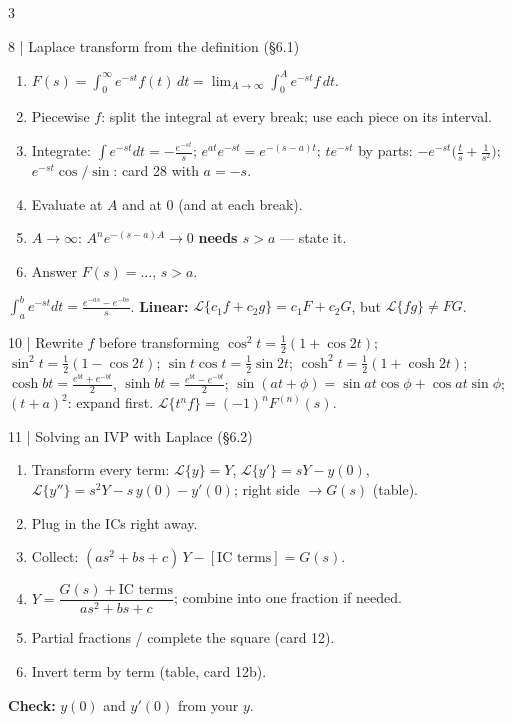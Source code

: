\documentclass[8pt]{extarticle}
\newcommand{\key}[1]{\textcolor{grn}{\textbf{#1}}}
\newcommand{\chk}[1]{\par\textcolor{grn}{\textbf{Check:}} #1}
\newcommand{\Lap}{\mathcal{L}}
\begin{document}
\begin{multicols*}{3}
\begin{card}{8 \;|\; Laplace transform from the definition (\S6.1)}
\begin{enumerate}
\item $F(s)=\displaystyle\int_0^\infty e^{-st}f(t)\,dt=\lim_{A\to\infty}\int_0^Ae^{-st}f\,dt$.
\item Piecewise $f$: split the integral at every break; use each piece on its interval.
\item Integrate: $\int e^{-st}dt=-\frac{e^{-st}}s$; $e^{at}e^{-st}=e^{-(s-a)t}$; $te^{-st}$ by parts: $-e^{-st}\big(\frac ts+\frac1{s^2}\big)$; $e^{-st}\!\cos/\sin$: card 28 with $a=-s$.
\item Evaluate at $A$ and at $0$ (and at each break).
\item $A\to\infty$: $A^ne^{-(s-a)A}\to0$ \textbf{needs $s>a$} --- state it.
\item Answer $F(s)=\dots$, \;$s>a$.
\end{enumerate}
$\int_a^be^{-st}dt=\frac{e^{-as}-e^{-bs}}s$. \;\key{Linear:} $\Lap\{c_1f+c_2g\}=c_1F+c_2G$, but $\Lap\{fg\}\ne FG$.
\end{card}

\begin{card}{10 \;|\; Rewrite $f$ before transforming}
$\cos^2t=\frac12(1+\cos2t)$; \;$\sin^2t=\frac12(1-\cos2t)$; \;$\sin t\cos t=\frac12\sin2t$; \;$\cosh^2t=\frac12(1+\cosh2t)$; \;$\cosh bt=\frac{e^{bt}+e^{-bt}}2$, $\sinh bt=\frac{e^{bt}-e^{-bt}}2$; \;$\sin(at+\phi)=\sin at\cos\phi+\cos at\sin\phi$; \;$(t+a)^2$: expand first. \;$\Lap\{t^nf\}=(-1)^nF^{(n)}(s)$.
\end{card}

\begin{card}{11 \;|\; Solving an IVP with Laplace (\S6.2)}
\begin{enumerate}
\item Transform every term: $\Lap\{y\}=Y$, \;$\Lap\{y'\}=sY-y(0)$, \;$\Lap\{y''\}=s^2Y-s\,y(0)-y'(0)$; right side $\to G(s)$ (table).
\item Plug in the ICs right away.
\item Collect: $(as^2+bs+c)\,Y-[\text{IC terms}]=G(s)$.
\item $Y=\dfrac{G(s)+\text{IC terms}}{as^2+bs+c}$; combine into one fraction if needed.
\item Partial fractions / complete the square (card 12).
\item Invert term by term (table, card 12b).
\end{enumerate}
\chk{$y(0)$ and $y'(0)$ from your $y$.}
\end{card}


\end{multicols*}
\end{document}
